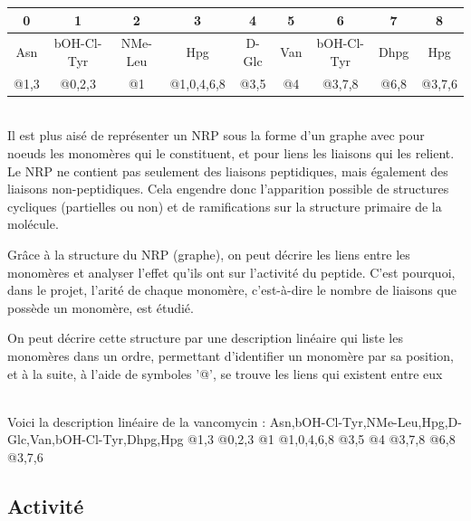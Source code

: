 \documentclass[a4paper,10pt]{report}
\begin{document}
	\begin{flushleft}
	  \begin{tabular}{|c|c|c|c|c|c|c|c|c|}\hline
	    \color{blue}0 & \color{blue}1 & \color{blue}2 & \color{blue}3 & \color{blue}4 & \color{blue}5 & \color{blue}6 & \color{blue}7 & \color{blue}8 \\\hline
	    Asn & bOH-Cl-Tyr & NMe-Leu & Hpg & D-Glc & Van & bOH-Cl-Tyr & Dhpg & Hpg \\\hline
	    @1,3 & @0,2,3 & @1 & @1,0,4,6,8 & @3,5 & @4 & @3,7,8 & @6,8 & @3,7,6 \\\hline
	  \end{tabular}
	  \label{table0}
	 \end{flushleft}
	

	~~\\Il est plus aisé de représenter un NRP sous la forme d'un graphe avec pour noeuds les monomères qui le constituent, et pour liens les liaisons qui les relient.
	Le NRP ne contient pas seulement des liaisons peptidiques, mais également des liaisons non-peptidiques. Cela engendre donc l'apparition possible de structures cycliques (partielles ou non) et de ramifications sur la structure primaire de la molécule. 
	
	Grâce à la structure du NRP (graphe), on peut décrire les liens entre les monomères et analyser l'effet qu'ils ont sur l'activité du peptide.
	C'est pourquoi, dans le projet, l'arité de chaque monomère, c'est-à-dire le nombre de liaisons que possède un monomère, est étudié.
	
	On peut décrire cette structure par une description linéaire qui liste les monomères dans un ordre, permettant d'identifier un monomère par sa position, et à la suite, à l'aide de symboles '@', se trouve les liens qui existent entre eux
	
	\\Voici la description linéaire de la vancomycin : Asn,bOH-Cl-Tyr,NMe-Leu,Hpg,D-Glc,Van,bOH-Cl-Tyr,Dhpg,Hpg @1,3 @0,2,3 @1 @1,0,4,6,8 @3,5 @4 @3,7,8 @6,8 @3,7,6 
	
	\subsection{Activité}
	
\end{document}
